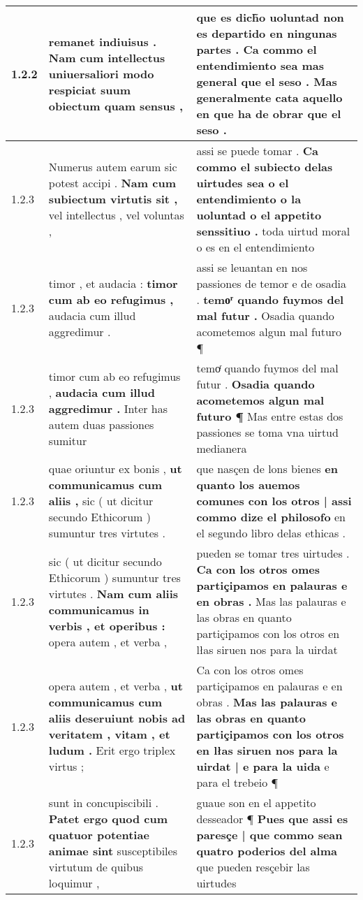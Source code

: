 \begin{tabular}{|p{1cm}|p{6.5cm}|p{6.5cm}|}
1.2.2 & remanet indiuisus . \textbf{ Nam cum intellectus uniuersaliori modo } respiciat suum obiectum quam sensus , & que es dich̃o uoluntad non es departido en ningunas partes . \textbf{ Ca commo el entendimiento sea mas general que el seso . } Mas generalmente cata aquello en que ha de obrar que el seso . \\\hline
1.2.3 & Numerus autem earum sic potest accipi . \textbf{ Nam cum subiectum virtutis sit , } vel intellectus , vel voluntas , & assi se puede tomar . \textbf{ Ca commo el subiecto delas uirtudes sea o el entendimiento o la uoluntad o el appetito senssitiuo . } toda uirtud moral o es en el entendimiento \\\hline
1.2.3 & timor , et audacia : \textbf{ timor cum ab eo refugimus , } audacia cum illud aggredimur . & assi se leuantan en nos passiones de temor e de osadia . \textbf{ temoͬ quando fuymos del mal futur . } Osadia quando acometemos algun mal futuro ¶ \\\hline
1.2.3 & timor cum ab eo refugimus , \textbf{ audacia cum illud aggredimur . } Inter has autem duas passiones sumitur & temoͬ quando fuymos del mal futur . \textbf{ Osadia quando acometemos algun mal futuro ¶ } Mas entre estas dos passiones se toma vna uirtud medianera \\\hline
1.2.3 & quae oriuntur ex bonis , \textbf{ ut communicamus cum aliis , } sic ( ut dicitur secundo Ethicorum ) sumuntur tres virtutes . & que nasçen de lons bienes \textbf{ en quanto los auemos comunes con los otros | assi commo dize el philosofo } en el segundo libro delas ethicas . \\\hline
1.2.3 & sic ( ut dicitur secundo Ethicorum ) sumuntur tres virtutes . \textbf{ Nam cum aliis communicamus in verbis , et operibus : } opera autem , et verba , & pueden se tomar tres uirtudes . \textbf{ Ca con los otros omes partiçipamos en palauras e en obras . } Mas las palauras e las obras en quanto partiçipamos con los otros en lłas siruen nos para la uirdat \\\hline
1.2.3 & opera autem , et verba , \textbf{ ut communicamus cum aliis deseruiunt nobis ad veritatem , vitam , et ludum . } Erit ergo triplex virtus ; & Ca con los otros omes partiçipamos en palauras e en obras . \textbf{ Mas las palauras e las obras en quanto partiçipamos con los otros en lłas siruen nos para la uirdat | e para la uida } e para el trebeio ¶ \\\hline
1.2.3 & sunt in concupiscibili . \textbf{ Patet ergo quod cum quatuor potentiae animae sint } susceptibiles virtutum de quibus loquimur , & guaue son en el appetito desseador ¶ \textbf{ Pues que assi es paresçe | que commo sean quatro poderios del alma } que pueden resçebir las uirtudes \\\hline

\end{tabular}
